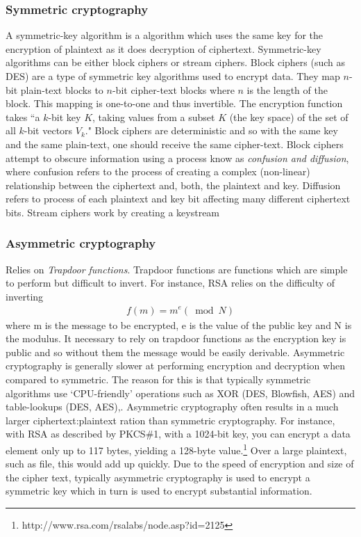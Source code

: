 \documentclass[12pt, titlepage]{article}
\begin{document}
\subsubsection*{Symmetric cryptography}
A symmetric-key algorithm is a algorithm which uses the same key for the encryption of plaintext as it does decryption of ciphertext. Symmetric-key algorithms can be either block ciphers or stream ciphers. Block ciphers (such as DES) are a type of symmetric key algorithms used to encrypt data. They map $n$-bit plain-text blocks to $n$-bit cipher-text blocks where $n$ is the length of the block. This mapping is one-to-one and thus invertible. The encryption function takes ``a $k$-bit key $K$, taking values from a subset $K$ (the key space) of the set of all $k$-bit vectors $V_{k}$." \cite{blockCiphers} Block ciphers are deterministic and so with the same key and the same plain-text, one should receive the same cipher-text.
\newline \indent Block ciphers attempt to obscure information using a process know as \textit{confusion and diffusion}, where confusion refers to the process of creating a complex (non-linear) relationship between the ciphertext and, both, the plaintext and key. Diffusion refers to process of each plaintext and key bit affecting many different ciphertext bits.
\newline \indent Stream ciphers work by creating a keystream

\subsubsection*{Asymmetric cryptography}
Relies on \textit{Trapdoor functions}. Trapdoor functions are functions which are simple to perform but difficult to invert. For instance, RSA relies on the difficulty of inverting
\begin{align*}
f(m) = m^e (\bmod N)
\end{align*}
where m is the message to be encrypted, e is the value of the public key and N is the modulus.
\newline It necessary to rely on trapdoor functions as the encryption key is public and so without them the message would be easily derivable.
\newline \indent Asymmetric cryptography is generally slower at performing encryption and decryption when compared to symmetric. The reason for this is that typically symmetric algorithms use `CPU-friendly' operations such as XOR (DES, Blowfish, AES) and table-lookups (DES, AES),.
\newline \indent Asymmetric cryptography often results in a much larger ciphertext:plaintext ration than symmetric cryptography. For instance, with RSA as described by PKCS\#1, with a 1024-bit key, you can encrypt a data element only up to 117 bytes, yielding a 128-byte value.\footnote{http://www.rsa.com/rsalabs/node.asp?id=2125} Over a large plaintext, such as file, this would add up quickly.
\newline \indent Due to the speed of encryption and size of the cipher text, typically asymmetric cryptography is used to encrypt a symmetric key which in turn is used to encrypt substantial information.
\end{document}
